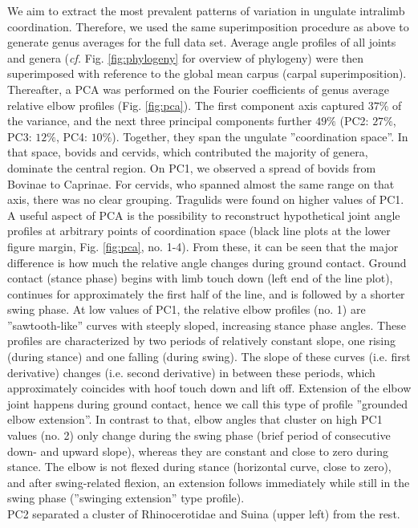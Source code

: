 \documentclass[10pt, a4paper]{article}
\begin{document}
We aim to extract the most prevalent patterns of variation in ungulate intralimb coordination. 
Therefore, we used the same superimposition procedure as above to generate genus averages for the full data set. 
Average angle profiles of all joints and genera (\textit{cf.} Fig. \ref{fig:phylogeny} for overview of phylogeny) were  then superimposed with reference to the global mean carpus (carpal superimposition). 
Thereafter, a PCA was performed on the Fourier coefficients of genus average relative elbow profiles (Fig. \ref{fig:pca}). 
The first component axis captured $37\%$ of the variance, and the next three principal components further $49\%$ (PC2: $27\%$, PC3: $12\%$, PC4: $10\%$). 
Together, they span the ungulate ''coordination space''. 
In that space, bovids and cervids, which contributed the majority of genera, dominate the central region. 
On PC1, we observed a spread of bovids from {Bovinae} to {Caprinae}. 
For cervids, who spanned almost the same range on that axis, there was no clear grouping. 
Tragulids were found on higher values of PC1. 
A useful aspect of PCA is the possibility to reconstruct hypothetical joint angle profiles at arbitrary points of coordination space (black line plots at the lower figure margin, Fig. \ref{fig:pca}, no. 1-4). 
From these, it can be seen that the major difference is how much the relative angle changes during ground contact. 
Ground contact (stance phase) begins with limb touch down (left end of the line plot), continues for approximately the first half of the line, and is followed by a shorter swing phase. 
At low values of PC1, the relative elbow profiles (no. 1) are ''sawtooth-like'' curves with steeply sloped, increasing stance phase angles. 
These profiles are characterized by two periods of relatively constant slope, one rising (during stance) and one falling (during swing). 
The slope of these curves (i.e. first derivative) changes (i.e. second derivative) in between these periods, which approximately coincides with hoof touch down and lift off. 
Extension of the elbow joint happens during ground contact, hence we call this type of profile ''grounded elbow extension''. 
In contrast to that, elbow angles that cluster on high PC1 values (no. 2) only change during the swing phase (brief period of consecutive down- and upward slope), whereas they are constant and close to zero during stance. 
The elbow is not flexed during stance (horizontal curve, close to zero), and after swing-related flexion, an extension follows immediately while still in the swing phase (''swinging extension'' type profile). 
\\PC2 separated a cluster of Rhinocerotidae and Suina (upper left) from the rest. 
\end{document}
